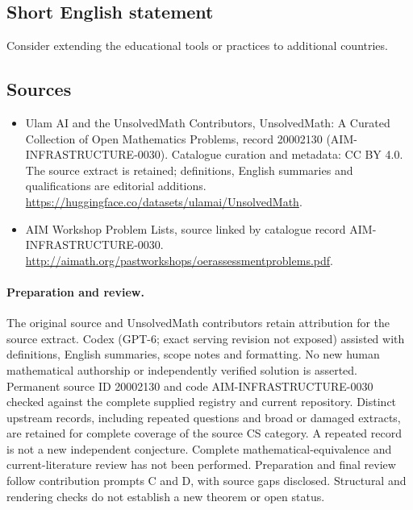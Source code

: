 \documentclass[11pt]{article}
\begin{document}
\subsection{Short English statement}
Consider extending the educational tools or practices to additional countries.
\subsection{Sources}
\begin{itemize}
\item[\hypertarget{source:20002130:1}{S1}] Ulam AI and the UnsolvedMath Contributors, UnsolvedMath: A Curated Collection of Open Mathematics Problems, record 20002130 (AIM-INFRASTRUCTURE-0030). Catalogue curation and metadata: CC BY 4.0. The source extract is retained; definitions, English summaries and qualifications are editorial additions.
\url{https://huggingface.co/datasets/ulamai/UnsolvedMath}.
\item[\hypertarget{source:20002130:2}{S2}] AIM Workshop Problem Lists, source linked by catalogue record AIM-INFRASTRUCTURE-0030.
\url{http://aimath.org/pastworkshops/oerassessmentproblems.pdf}.
\end{itemize}
\paragraph{Preparation and review.}
The original source and UnsolvedMath contributors retain attribution for the source extract. Codex (GPT-6; exact serving revision not exposed) assisted with definitions, English summaries, scope notes and formatting. No new human mathematical authorship or independently verified solution is asserted. Permanent source ID 20002130 and code AIM-INFRASTRUCTURE-0030 checked against the complete supplied registry and current repository. Distinct upstream records, including repeated questions and broad or damaged extracts, are retained for complete coverage of the source CS category. A repeated record is not a new independent conjecture. Complete mathematical-equivalence and current-literature review has not been performed. Preparation and final review follow contribution prompts C and D, with source gaps disclosed. Structural and rendering checks do not establish a new theorem or open status.
\label{end:20002130}
\end{document}
